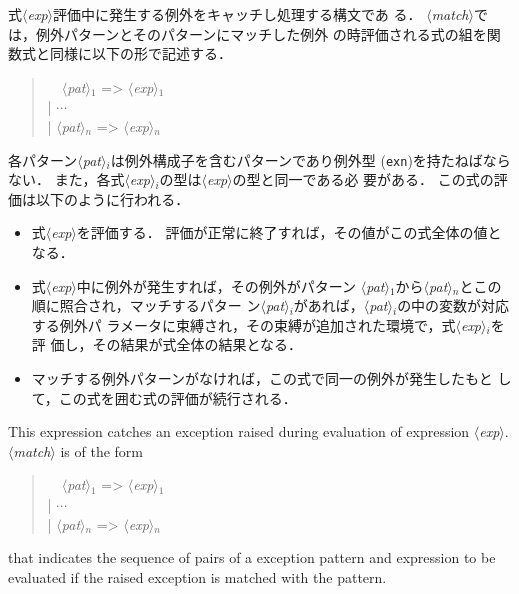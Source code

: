 \documentclass{jbook}
\newcommand{\code}[1]{\mbox{\large\tt #1}}
\newcommand{\nonterm}[1]{\mbox{$\langle$}{\it #1}\mbox{$\rangle$}}
\newcommand{\myem}{\mbox{\ \ }}
\newenvironment{program}{\begin{quote}\begin{tt}}%
                        {\end{tt}\end{quote}}
\begin{document}
\ifjp%
	式\nonterm{exp}評価中に発生する例外をキャッチし処理する構文であ
る．
	\nonterm{match}では，例外パターンとそのパターンにマッチした例外
の時評価される式の組を関数式と同様に以下の形で記述する．
\begin{program}
\myem  \nonterm{pat}$_1$ => \nonterm{exp}$_1$
\\
| $\cdots$
\\
| \nonterm{pat}$_n$ => \nonterm{exp}$_n$
\end{program}
	各パターン\nonterm{pat}$_i$は例外構成子を含むパターンであり例外型
(\code{exn})を持たねばならない．
	また，各式\nonterm{exp}$_i$の型は\nonterm{exp}の型と同一である必
要がある．
	この式の評価は以下のように行われる．
\begin{itemize}
\item 式\nonterm{exp}を評価する．
	評価が正常に終了すれば，その値がこの式全体の値となる．
\item 式\nonterm{exp}中に例外が発生すれば，その例外がパターン
\nonterm{pat}$_1$から\nonterm{pat}$_n$とこの順に照合され，マッチするパター
ン\nonterm{pat}$_i$があれば，\nonterm{pat}$_i$の中の変数が対応する例外パ
ラメータに束縛され，その束縛が追加された環境で，式\nonterm{exp}$_i$を評
価し，その結果が式全体の結果となる．
\item マッチする例外パターンがなければ，この式で同一の例外が発生したもと
して，この式を囲む式の評価が続行される．
\end{itemize}	
\else%
	This expression catches an exception raised during evaluation
of expression \nonterm{exp}.
	\nonterm{match} is of the form
\begin{program}
\myem  \nonterm{pat}$_1$ => \nonterm{exp}$_1$
\\
| $\cdots$
\\
| \nonterm{pat}$_n$ => \nonterm{exp}$_n$
\end{program}
that indicates the sequence of pairs of a exception
pattern and expression to be evaluated if the raised exception is
matched with the pattern.
\end{document}
